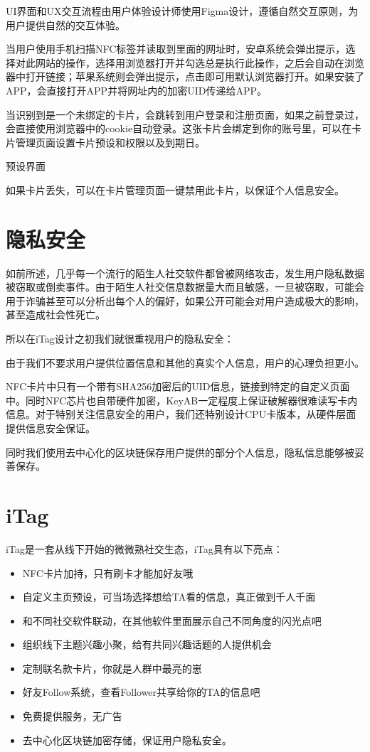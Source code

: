 \documentclass[UTF8]{ctexart}
\begin{document}
UI界面和UX交互流程由用户体验设计师使用Figma设计，遵循自然交互原则，为用户提供自然的交互体验。

当用户使用手机扫描NFC标签并读取到里面的网址时，安卓系统会弹出提示，选择对此网站的操作，选择用浏览器打开并勾选总是执行此操作，之后会自动在浏览器中打开链接；苹果系统则会弹出提示，点击即可用默认浏览器打开。如果安装了APP，会直接打开APP并将网址内的加密UID传递给APP。

当识别到是一个未绑定的卡片，会跳转到用户登录和注册页面，如果之前登录过，会直接使用浏览器中的cookie自动登录。这张卡片会绑定到你的账号里，可以在卡片管理页面设置卡片预设和权限以及到期日。

预设界面

如果卡片丢失，可以在卡片管理页面一键禁用此卡片，以保证个人信息安全。

\section{隐私安全}

如前所述，几乎每一个流行的陌生人社交软件都曾被网络攻击，发生用户隐私数据被窃取或倒卖事件。由于陌生人社交信息数据量大而且敏感，一旦被窃取，可能会用于诈骗甚至可以分析出每个人的偏好，如果公开可能会对用户造成极大的影响，甚至造成社会性死亡。

所以在iTag设计之初我们就很重视用户的隐私安全：

由于我们不要求用户提供位置信息和其他的真实个人信息，用户的心理负担更小。

NFC卡片中只有一个带有SHA256加密后的UID信息，链接到特定的自定义页面中。同时NFC芯片也自带硬件加密，KeyAB一定程度上保证破解器很难读写卡内信息。对于特别关注信息安全的用户，我们还特别设计CPU卡版本，从硬件层面提供信息安全保证。

同时我们使用去中心化的区块链保存用户提供的部分个人信息，隐私信息能够被妥善保存。

\section{iTag}
iTag是一套从线下开始的微微熟社交生态，iTag具有以下亮点：

\begin{itemize}
    \item NFC卡片加持，只有刷卡才能加好友哦
    \item 自定义主页预设，可当场选择想给TA看的信息，真正做到千人千面
    \item 和不同社交软件联动，在其他软件里面展示自己不同角度的闪光点吧
    \item 组织线下主题兴趣小聚，给有共同兴趣话题的人提供机会
    \item 定制联名款卡片，你就是人群中最亮的崽
    \item 好友Follow系统，查看Follower共享给你的TA的信息吧~
    \item 免费提供服务，无广告
    \item 去中心化区块链加密存储，保证用户隐私安全。
\end{itemize}
\end{document}
